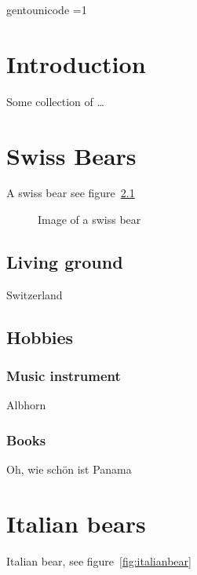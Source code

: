  \ifdefined\directlua
 \pdfvariable gentounicode =1
 \protected\def\pdfglyphtounicode {\pdfextension glyphtounicode } 
 
 \fi
\tableofcontents

\listoffigures

\newpage

\chapter{Introduction}

Some collection of \ldots 


\chapter{Swiss Bears}

A swiss bear see figure~\ref{fig:swissbear}

\begin{figure}
\caption{Image of a swiss bear\label{fig:swissbear}}
\end{figure}

\section{Living ground}

Switzerland

\section{Hobbies}

\subsection{Music instrument}
Albhorn

\subsection{Books}
Oh, wie schön ist Panama


\chapter{Italian bears}

Italian bear, see figure~\ref{fig:italianbear}

